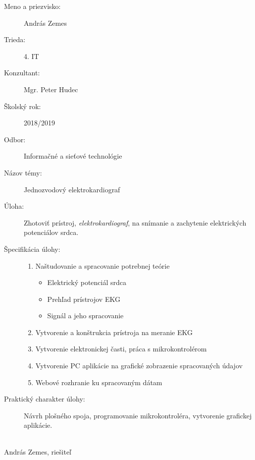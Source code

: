 \documentclass[titlepage]{article}
\begin{document}
\begin{description}
	\item [Meno a priezvisko:]
		\tabto{4cm} András Zemes
		
    \item [Trieda:]	
    	\tabto{4cm} 4. IT
    	
	\item [Konzultant:]		 	  
		\tabto{4cm} Mgr. Peter Hudec
		
	\item [Školský rok:] 
		\tabto{4cm} 2018/2019
		
	\item [Odbor:]		  
		\tabto{4cm} Informačné a sieťové technológie
		
	\item [Názov témy:]			  
		\tabto{4cm} Jednozvodový elektrokardiograf 
		
	\item [Úloha:]				  
		\tabto{4cm} Zhotoviť prístroj, \emph{elektrokardiograf}, na snímanie 
		\tabto{4cm} a zachytenie elektrických potenciálov srdca.
		
	\item [Špecifikácia úlohy:] \hfill
	
    \begin{enumerate}
		\item Naštudovanie a spracovanie potrebnej teórie
		\begin{itemize}
			\item Elektrický potenciál srdca
        	\item Prehľad prístrojov EKG
        	\item Signál a jeho spracovanie
		\end{itemize}
    	\item Vytvorenie a konštrukcia prístroja na meranie EKG
    	\item Vytvorenie elektronickej časti, práca s mikrokontrolérom
    	\item Vytvorenie PC aplikácie na grafické zobrazenie spracovaných údajov
    	\item Webové rozhranie ku spracovaným dátam
	\end{enumerate}
	
	\item [Praktický charakter úlohy:]
		Návrh plošného spoja, programovanie 
		\tabto{4cm} mikrokontroléra, vytvorenie grafickej aplikácie.
		
\end{description}
	
\vspace{10mm}
\hrulefill
\\\hspace*{0mm}\phantom{v.r.: }András Zemes, riešiteľ
\end{document}
